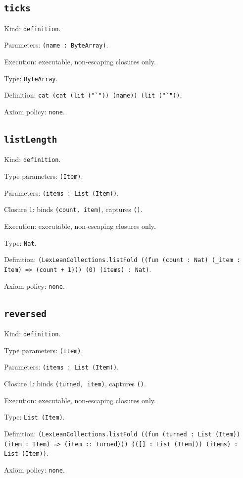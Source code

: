 \documentclass[11pt]{article}
\begin{document}
\subsection*{\texttt{ticks}}
\noindent Kind: \texttt{definition}.\par
\noindent Parameters: \texttt{(name : ByteArray)}.\par
\noindent Execution: executable, non-escaping closures only.\par
\noindent Type: \texttt{ByteArray}.\par
\noindent Definition: \texttt{cat (cat (lit ("`")) (name)) (lit ("`"))}.\par
\noindent Axiom policy: \texttt{none}.\par
\subsection*{\texttt{listLength}}
\noindent Kind: \texttt{definition}.\par
\noindent Type parameters: \texttt{(Item)}.\par
\noindent Parameters: \texttt{(items : List (Item))}.\par
\noindent Closure 1: binds \texttt{(count, item)}, captures \texttt{()}.\par
\noindent Execution: executable, non-escaping closures only.\par
\noindent Type: \texttt{Nat}.\par
\noindent Definition: \texttt{(LexLeanCollections.listFold ((fun (count : Nat) (\_item : Item) => (count + 1))) (0) (items) : Nat)}.\par
\noindent Axiom policy: \texttt{none}.\par
\subsection*{\texttt{reversed}}
\noindent Kind: \texttt{definition}.\par
\noindent Type parameters: \texttt{(Item)}.\par
\noindent Parameters: \texttt{(items : List (Item))}.\par
\noindent Closure 1: binds \texttt{(turned, item)}, captures \texttt{()}.\par
\noindent Execution: executable, non-escaping closures only.\par
\noindent Type: \texttt{List (Item)}.\par
\noindent Definition: \texttt{(LexLeanCollections.listFold ((fun (turned : List (Item)) (item : Item) => (item :: turned))) (([] : List (Item))) (items) : List (Item))}.\par
\noindent Axiom policy: \texttt{none}.\par
\end{document}
